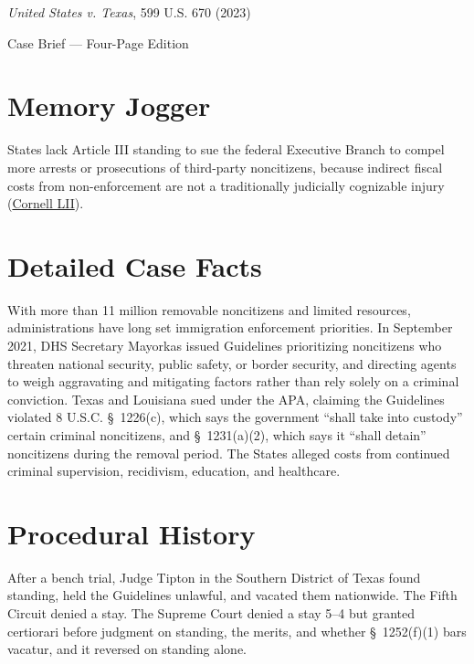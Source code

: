 \documentclass[12pt]{article}
\begin{document}
\begin{center}
{\LARGE \textit{United States v. Texas}, 599 U.S. 670 (2023)\par}
\vspace{0.8em}
{\large Case Brief --- Four-Page Edition\par}
\end{center}
\vspace{1em}

\section{Memory Jogger}

States lack Article III standing to sue the federal Executive Branch to compel more arrests or prosecutions of third-party noncitizens, because indirect fiscal costs from non-enforcement are not a traditionally judicially cognizable injury (\href{https://www.law.cornell.edu/supremecourt/text/22-58}{Cornell LII}).

\section{Detailed Case Facts}

With more than 11 million removable noncitizens and limited resources, administrations have long set immigration enforcement priorities. In September 2021, DHS Secretary Mayorkas issued Guidelines prioritizing noncitizens who threaten national security, public safety, or border security, and directing agents to weigh aggravating and mitigating factors rather than rely solely on a criminal conviction. Texas and Louisiana sued under the APA, claiming the Guidelines violated 8 U.S.C. \S~1226(c), which says the government ``shall take into custody'' certain criminal noncitizens, and \S~1231(a)(2), which says it ``shall detain'' noncitizens during the removal period. The States alleged costs from continued criminal supervision, recidivism, education, and healthcare.

\section{Procedural History}

After a bench trial, Judge Tipton in the Southern District of Texas found standing, held the Guidelines unlawful, and vacated them nationwide. The Fifth Circuit denied a stay. The Supreme Court denied a stay 5--4 but granted certiorari before judgment on standing, the merits, and whether \S~1252(f)(1) bars vacatur, and it reversed on standing alone.
\end{document}
